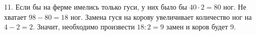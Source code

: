 11. Если бы на ферме имелись только гуси, у них было бы  $40\cdot2=80$ ног. Не хватает $98-80=18$ ног. Замена гуся на корову увеличивает количество ног на $4-2=2.$
Значит, необходимо произвести $18:2=9$ замен и коров будет 9.\\
